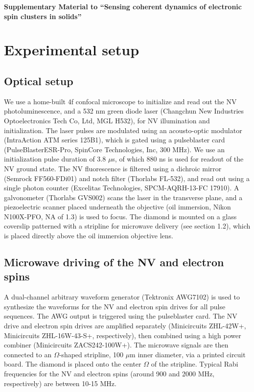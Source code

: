 \documentclass[%
 reprint,
 amsmath,amssymb,
 aps,
]{revtex4-1}
\begin{document}
\begin{thebibliography}{9}
\end{thebibliography}

\pagebreak
\pagebreak 
\widetext
\begin{center}
\textbf{\large Supplementary Material to ``Sensing coherent dynamics of electronic spin clusters in solids''}
\end{center}

\setcounter{equation}{0}
\setcounter{figure}{0}
\setcounter{table}{0}
\section{Experimental setup}
\subsection{Optical setup}
We use a home-built 4f confocal microscope to initialize and read out the NV photoluminescence, and a 532 nm green diode laser (Changchun New Industries Optoelectronics Tech Co, Ltd, MGL H532), for NV illumination and initialization. The laser pulses are modulated using an acousto-optic modulator (IntraAction ATM series 125B1), which is gated using a pulseblaster card (PulseBlasterESR-Pro, SpinCore Technologies, Inc, 300 MHz). We use an initialization pulse duration of 3.8 $\mu$s, of which $880$ ns is used for readout of the NV ground state. The NV fluorescence is filtered using a dichroic mirror (Semrock FF560-FDi01) and notch filter (Thorlabs FL-532), and read out using a single photon counter (Excelitas Technologies, SPCM-AQRH-13-FC 17910). A galvonometer (Thorlabs GVS002) scans the laser in the transverse plane, and a piezoelectric scanner placed underneath the objective (oil immersion, Nikon N100X-PFO, NA of 1.3) is used to focus. The diamond is mounted on a glass coverslip patterned with a stripline for microwave delivery (see section 1.2), which is placed directly above the oil immersion objective lens.
\subsection{Microwave driving of the NV and electron spins}
A dual-channel arbitrary waveform generator (Tektronix AWG7102) is used to synthesize the waveforms for the NV and electron spin drives for all pulse sequences. The AWG output is triggered using the pulseblaster card. The NV drive and electron spin drives are amplified  separately (Minicircuits ZHL-42W+, Minicircuits ZHL-16W-43-S+, respectively), then combined using a high power combiner (Minicircuits ZACS242-100W+). The microwave signals are then connected to an $\Omega$-shaped stripline, 100 $\mu$m inner diameter, via a printed circuit board. The diamond is placed onto the center $\Omega$ of the stripline. Typical Rabi frequencies for the NV and electron spins (around 900 and 2000 MHz, respectively) are between 10-15 MHz. 
\end{document}
